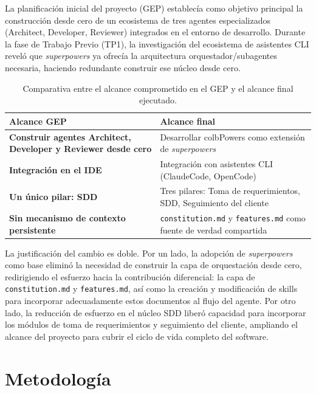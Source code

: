 \documentclass[11pt, letterpaper]{article}
\begin{document}
La planificación inicial del proyecto (GEP) establecía como objetivo principal la construcción desde cero de un ecosistema de tres agentes especializados (Architect, Developer, Reviewer) integrados en el entorno de desarrollo. Durante la fase de Trabajo Previo (TP1), la investigación del ecosistema de asistentes CLI reveló que \textit{superpowers} ya ofrecía la arquitectura orquestador/subagentes necesaria, haciendo redundante construir ese núcleo desde cero.

\begin{table}[H]
\centering
\begin{tabularx}{\textwidth}{>{\raggedright\arraybackslash}X >{\raggedright\arraybackslash}X}
    \toprule
    \textbf{Alcance GEP} & \textbf{Alcance final} \\
    \midrule
    \textbf{Construir agentes Architect, Developer y Reviewer desde cero} & Desarrollar colbPowers como extensión de \textit{superpowers} \\
    \textbf{Integración en el IDE} & Integración con asistentes CLI (ClaudeCode, OpenCode) \\
    \textbf{Un único pilar: SDD} & Tres pilares: Toma de requerimientos, SDD, Seguimiento del cliente \\
    \textbf{Sin mecanismo de contexto persistente} & \texttt{constitution.md} y \texttt{features.md} como fuente de verdad compartida \\
    \bottomrule
\end{tabularx}
\caption{Comparativa entre el alcance comprometido en el GEP y el alcance final ejecutado.}
\label{tab:comparativa_alcance}
\end{table}

La justificación del cambio es doble. Por un lado, la adopción de \textit{superpowers} como base eliminó la necesidad de construir la capa de orquestación desde cero, redirigiendo el esfuerzo hacia la contribución diferencial: la capa de \texttt{constitution.md} y \texttt{features.md}, así como la creación y modificación de skills para incorporar adecuadamente estos documentos al flujo del agente. Por otro lado, la reducción de esfuerzo en el núcleo SDD liberó capacidad para incorporar los módulos de toma de requerimientos y seguimiento del cliente, ampliando el alcance del proyecto para cubrir el ciclo de vida completo del software.

\newpage

\section{Metodología}
\label{sec:metodologia}
\end{document}
